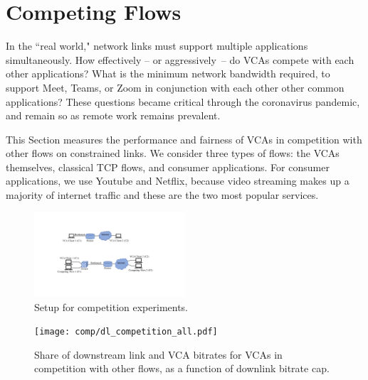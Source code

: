 

\section{Competing Flows}

In the ``real world," network links must support multiple applications simultaneously.
How effectively -- or aggressively~-- do VCAs compete with each other applications?
What is the minimum network bandwidth required, to support Meet, Teams, or Zoom 
    in conjunction with each other other common applications?
These questions became critical through the coronavirus pandemic,
  and remain so as remote work remains prevalent.
    
This Section measures the performance and fairness of VCAs
    in competition with other flows on constrained links.
We consider three types of flows: 
  the VCAs themselves, classical TCP flows, and consumer applications.
For consumer applications, we use Youtube and Netflix,
  because video streaming makes up a majority of internet traffic and 
  these are the two most popular services.

\begin{figure}[]
   \centering
    \includegraphics[width=0.5\textwidth,keepaspectratio]{../figures/methodology/competition-setup.pdf}
    \caption{Setup for competition experiments.}
    \label{fig:competition-setup}
\end{figure}

\begin{figure}[t]
    \texttt{[image: comp/dl\_competition\_all.pdf]}
    \caption{Share of downstream link and VCA bitrates for VCAs in competition with other flows, as a function of downlink bitrate cap.}
	\label{fig:comp_bitrates_dl}
\end{figure}

